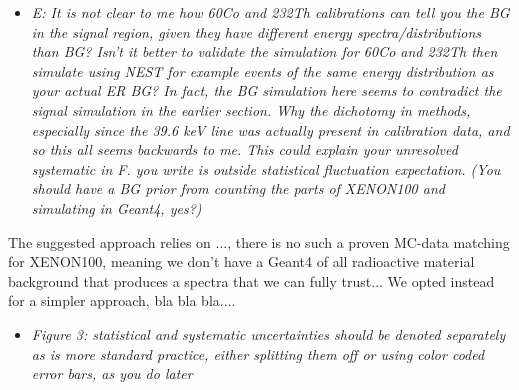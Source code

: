 \documentclass{article}
\begin{document}
\begin{itemize}
	\item \em{
E: It is not clear to me how 60Co and 232Th calibrations can tell you
the BG in the signal region, given they have different energy
spectra/distributions than BG? Isn’t it better to validate the
simulation for 60Co and 232Th then simulate using NEST for example
events of the same energy distribution as your actual ER BG? In fact,
the BG simulation here seems to contradict the signal simulation in
the earlier section. Why the dichotomy in methods, especially since
the 39.6 keV line was actually present in calibration data, and so
this all seems backwards to me. This could explain your unresolved
systematic in F. you write is outside statistical fluctuation
expectation. (You should have a BG prior from counting the parts of
XENON100 and simulating in Geant4, yes?)}
\end{itemize}

The suggested approach relies on ..., there is no such a proven MC-data
matching for XENON100, meaning we don't have a Geant4 of all radioactive material 
background that produces a spectra that we can fully trust... We opted instead
for a simpler approach, bla bla bla....


\begin{itemize}
	\item \em{
Figure 3: statistical and systematic uncertainties should be denoted
separately as is more standard practice, either splitting them off or
using color coded error bars, as you do later}
\end{itemize}
\end{document}
